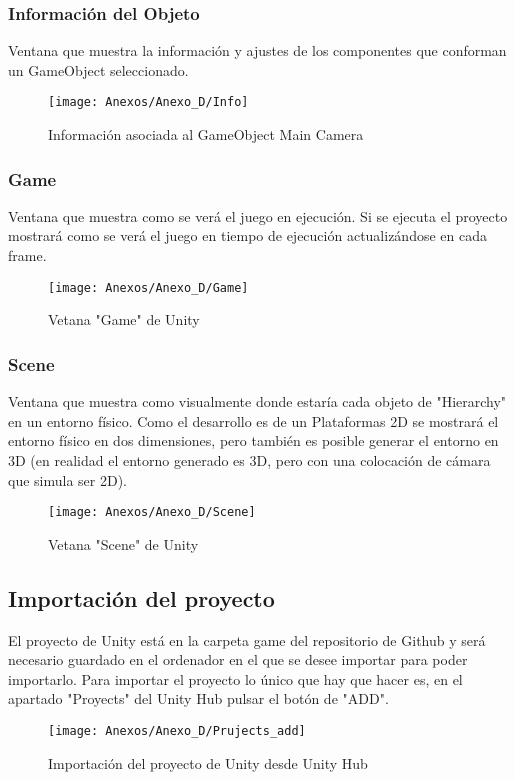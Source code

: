 \subsubsection{Información del Objeto}
Ventana que muestra la información y ajustes de los componentes que conforman un GameObject seleccionado.

\begin{figure}[h]
\centering
\texttt{[image: Anexos/Anexo\_D/Info]}
\caption{Información asociada al GameObject Main Camera}
\end{figure}

\subsubsection{Game}
Ventana que muestra como se verá el juego en ejecución. Si se ejecuta el proyecto mostrará como se verá el juego en tiempo de ejecución actualizándose en cada frame.

\begin{figure}[h]
\centering
\texttt{[image: Anexos/Anexo\_D/Game]}
\caption{Vetana "Game" de Unity}
\end{figure}

\subsubsection{Scene}
Ventana que muestra como visualmente donde estaría cada objeto de "Hierarchy" en un entorno físico. Como el desarrollo es de un Plataformas 2D se mostrará el entorno físico en dos dimensiones, pero también es posible generar el entorno en 3D (en realidad el entorno generado es 3D, pero con una colocación de cámara que simula ser 2D).

\clearpage
\begin{figure}[h]
\centering
\texttt{[image: Anexos/Anexo\_D/Scene]}
\caption{Vetana "Scene" de Unity}
\end{figure}

\subsection{Importación del proyecto}
El proyecto de Unity está en la carpeta game del repositorio de Github y será necesario guardado en el ordenador en el que se desee importar para poder importarlo.
Para importar el proyecto lo único que hay que hacer es, en el apartado "Proyects" del Unity Hub pulsar el botón de "ADD".

\begin{figure}[h]
\centering
\texttt{[image: Anexos/Anexo\_D/Prujects\_add]}
\caption{Importación del proyecto de Unity desde Unity Hub}
\end{figure}
\clearpage

